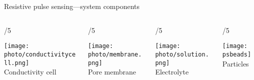 \begin{frame}[c]{Resistive pulse sensing---system components}


	\begin{columns}[t]
		\begin{column}[T]{\paperwidth/5}
			{\centering
				\texttt{[image: photo/conductivitycell.png]} \\
				{\footnotesize Conductivity cell}
				\par
			}
		\end{column}
		
		
		\begin{column}[T]{\paperwidth/5}
			{\centering
				\texttt{[image: photo/membrane.png]} \\
				{\footnotesize Pore membrane}
				\par
			}
		\end{column}
		
		
		
		\begin{column}[T]{\paperwidth/5}
			{\centering
				\texttt{[image: photo/solution.png]} \\
				{\footnotesize Electrolyte}
				\par
			}
		\end{column}

		
		

		
		\begin{column}[T]{\paperwidth/5}
			{\centering
				\texttt{[image: psbeads]} \\
				{\footnotesize Particles}
				\par
			}
		\end{column}


\end{columns}
\end{frame}
